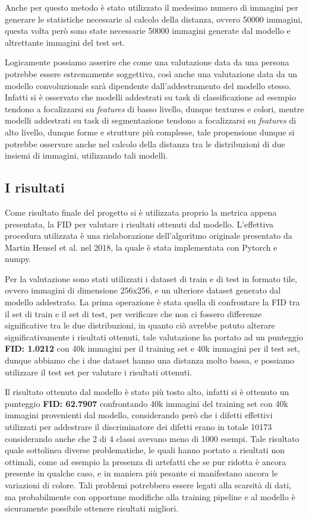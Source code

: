 Anche per questo metodo è stato utilizzato il medesimo numero di immagini per generare le statistiche necessarie al calcolo della distanza, 
ovvero 50000 immagini, questa volta però sono state necessarie 50000 immagini generate dal modello e altrettante immagini del test set.

Logicamente possiamo asserire che come una valutazione data da una persona potrebbe essere estremamente soggettiva, così anche una valutazione
data da un modello convoluzionale sarà dipendente dall'addestramento del modello stesso.
Infatti si è osservato che modelli addestrati su task di classificazione ad esempio tendono a focalizzarsi su \textit{features} di basso livello, dunque textures
e colori, mentre modelli addestrati su task di segmentazione tendono a focalizzarsi su \textit{features} di alto livello, dunque forme e strutture più complesse,
tale propensione dunque si potrebbe osservare anche nel calcolo della distanza tra le distribuzioni di due insiemi di immagini, utilizzando tali
modelli.

\subsection{I risultati}
Come risultato finale del progetto si è utilizzata proprio la metrica appena presentata, la FID per valutare i risultati ottenuti dal modello.
L'effettiva procedura utilizzata è una rielaborazione dell'algoritmo originale presentato da Martin Heusel et al. \cite{heusel2018gans} nel 2018,
la quale è stata implementata con Pytorch e numpy.

Per la valutazione sono stati utilizzati i dataset di train e di test in formato tile, ovvero immagini di dimensione 256x256, e un ulteriore dataset generato
dal modello addestrato. La prima operazione è stata quella di confrontare la FID tra il set di train e il set di test, per verificare che non ci fossero
differenze significative tra le due distribuzioni, in quanto ciò avrebbe potuto alterare significativamente i risultati ottenuti, tale valutazione ha portato ad un
punteggio \textbf{FID: 1.0212} con 40k immagini per il training set e 40k immagini per il test set, dunque abbiamo che i due dataset hanno una distanza molto bassa, 
e possiamo utilizzare il test set per valutare i risultati ottenuti.

Il risultato ottenuto dal modello è stato più tosto alto, infatti si è ottenuto un punteggio \textbf{FID: 62.7907} confrontando 40k immagini del training set con 
40k immagini provenienti dal modello, considerando però che i difetti effettivi utilizzati per addestrare il discriminatore dei difetti erano in totale 10173
considerando anche che 2 di 4 classi avevano meno di 1000 esempi.
Tale risultato quale sottolinea diverse problematiche, le quali hanno portato a risultati non ottimali, come ad esempio la presenza di artefatti 
che se pur ridotta è ancora presente in qualche caso, e in maniera più pesante si manifestano ancora le variazioni di colore.
Tali problemi potrebbero essere legati alla scarsità di dati, ma probabilmente con opportune modifiche alla training pipeline e al modello è sicuramente possibile
ottenere risultati migliori.

